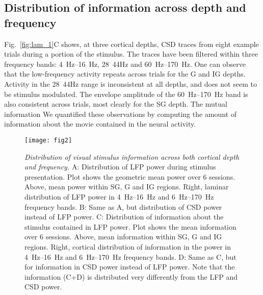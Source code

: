 \subsection{Distribution of information across depth and frequency}
Fig.~\ref{fig:lam_1}C shows, at three cortical depths, \ac{CSD} traces from eight example trials during a portion of the stimulus.
The traces have been filtered within three frequency bands: \SIrange{4}{16}{Hz}, \SI{28}{44}{Hz} and \SIrange{60}{170}{Hz}.
One can observe that the low-frequency activity repeats across trials for the \ac{G} and \ac{IG} depths.
Activity in the \SI{28}{44}{Hz} range is inconsistent at all depths, and does not seem to be stimulus modulated.
The envelope amplitude of the \SIrange{60}{170}{Hz} band is also consistent across trials, most clearly for the \ac{SG} depth.
The mutual information We quantified these observations by computing the amount of information about the movie contained in the neural activity.

\begin{figure}[htbp]
\centering \texttt{[image: fig2]}
%
\caption{%
\textit{Distribution of visual stimulus information across both cortical depth 
and frequency.}
A: Distribution of \ac{LFP} power during stimulus presentation.
Plot shows the geometric mean 
power over 6 sessions.
Above, mean power within \ac{SG}, \ac{G} and \ac{IG} regions.
Right, laminar distribution of \ac{LFP} power in
\SIrange{4}{16}{Hz} and \SIrange{6}{170}{Hz} frequency bands.
B: Same as A, but distribution of \ac{CSD} power instead of \ac{LFP} power.
C: Distribution of information about the stimulus contained in \ac{LFP} power.
Plot 
shows the mean information over 6 sessions.
Above, mean information within \ac{SG}, \ac{G} 
and \ac{IG} regions.
Right, cortical distribution of information in the power in
\SIrange{4}{16}{Hz} and \SIrange{6}{170}{Hz} frequency bands.
D: Same as C, but for information in \ac{CSD} power instead of \ac{LFP} power.
Note that the information (C+D) is distributed very differently from the \ac{LFP} and \ac{CSD} power.}%
\label{fig:lam_2}
\end{figure}

